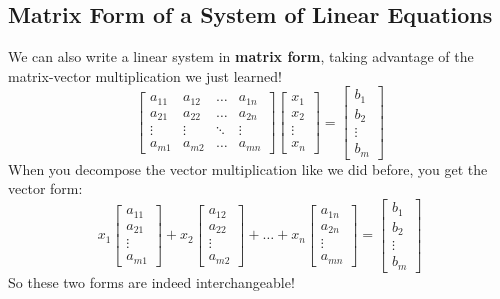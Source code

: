 \documentclass[11pt]{exam}
\begin{document}
    \vspace{20px}
    \subsection{Matrix Form of a System of Linear Equations}
    We can also write a linear system in \textbf{matrix form}, taking advantage of the matrix-vector multiplication we just learned!
    $$\begin{bmatrix}
        a_{11} & a_{12} & \dots & a_{1n} \\
        a_{21} & a_{22} & \dots & a_{2n} \\
        \vdots & \vdots & \ddots & \vdots \\
        a_{m1} & a_{m2} & \dots & a_{mn}
    \end{bmatrix}
    \begin{bmatrix} x_1 \\ x_2 \\ \vdots \\ x_n \end{bmatrix} =
    \begin{bmatrix} b_1 \\ b_2 \\ \vdots \\ b_m \end{bmatrix}$$
    When you decompose the vector multiplication like we did before, you get the vector form:
    $$x_1 \begin{bmatrix} a_{11} \\ a_{21} \\ \vdots \\ a_{m1} \end{bmatrix} +
      x_2 \begin{bmatrix} a_{12} \\ a_{22} \\ \vdots \\ a_{m2} \end{bmatrix} +
      \dots +
      x_n \begin{bmatrix} a_{1n} \\ a_{2n} \\ \vdots \\ a_{mn} \end{bmatrix} =
      \begin{bmatrix} b_1 \\ b_2 \\ \vdots \\ b_m \end{bmatrix}$$
    So these two forms are indeed interchangeable!
\end{document}
